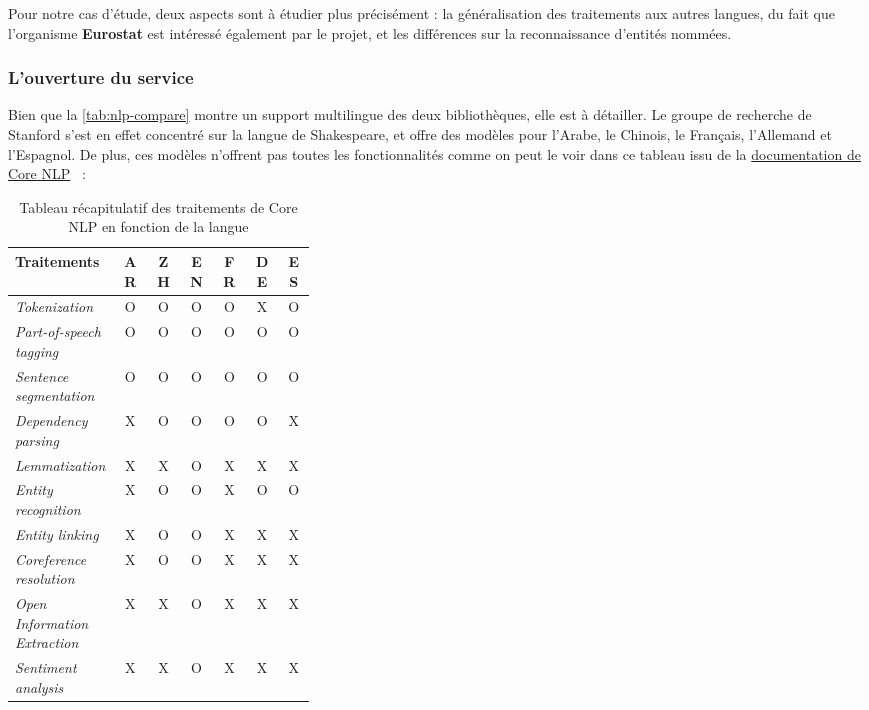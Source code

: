 Pour notre cas d'étude, deux aspects sont à étudier plus précisément : la généralisation des traitements aux autres langues, du fait que l'organisme \textbf{Eurostat} est intéressé également par le projet, et les différences sur la reconnaissance d'entités nommées.
\label{section 3.1.2}

\subsubsection{L'ouverture du service}
Bien que la \autoref{tab:nlp-compare} montre un support multilingue des deux bibliothèques, elle est à détailler. Le groupe de recherche de Stanford s'est en effet concentré sur la langue de Shakespeare, et offre des modèles pour l'Arabe, le Chinois, le Français, l'Allemand et l'Espagnol. De plus, ces modèles n'offrent pas toutes les fonctionnalités comme on peut le voir dans ce tableau issu de la \href{https://stanfordnlp.github.io/CoreNLP/human-languages.html}{documentation de Core NLP} \cite{corenlp-lang}~:
\vspace{10pt}
\begin{table}[H]
    \centering
    \begin{tabular}{| p{0.35\linewidth} | c | c | c | c | c | c |}
        \hline
        \textbf{Traitements} &AR &ZH &EN &FR &DE &ES\\
        \hline 
        \hline
        \textit{Tokenization} &O &O &O &O &X &O\\
        \hline
        \textit{Part-of-speech tagging} &O &O &O &O &O &O\\		
        \hline 
        \textit{Sentence segmentation} &O &O &O &O &O &O\\
        \hline 
        \textit{Dependency parsing} &X &O &O &O &O &X\\
        \hline
        \textit{Lemmatization} &X &X &O &X &X &X\\
        \hline 
        \textit{Entity recognition} &X &O &O &X &O &O\\
        \hline 
        \textit{Entity linking} &X &O &O &X &X &X\\
        \hline 
        \textit{Coreference resolution} &X &O &O &X &X &X\\
        \hline 
        \textit{Open Information Extraction} &X &X &O &X &X &X\\
        \hline 
        \textit{Sentiment analysis} &X &X &O &X &X &X\\
        \hline
    \end{tabular}
    \caption{Tableau récapitulatif des traitements de Core NLP en fonction de la langue}
    \label{tab:corenlp-lang}
\end{table}
\vspace{10pt}

